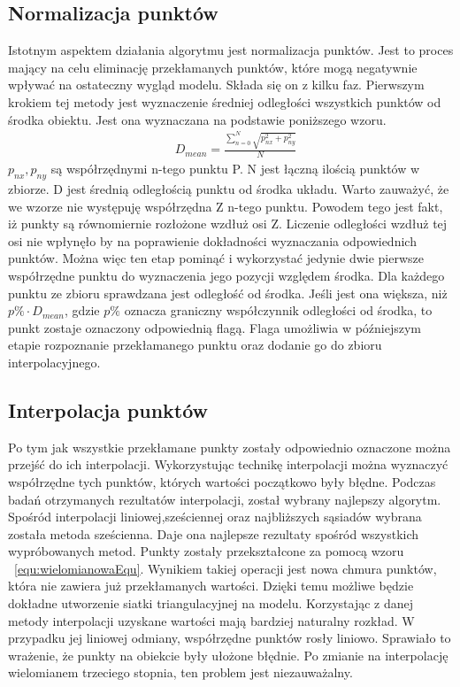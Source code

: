 \subsection{Normalizacja punktów}
Istotnym aspektem działania algorytmu jest normalizacja punktów. Jest to proces mający na celu eliminację przekłamanych punktów, które mogą negatywnie wpływać na ostateczny wygląd modelu. Składa się on z kilku faz.
\newline \indent Pierwszym krokiem tej metody jest wyznaczenie średniej odległości wszystkich punktów od środka obiektu. Jest ona wyznaczana na podstawie poniższego wzoru.
\begin{equation}
    \begin{aligned}
            &D_{mean}=\frac{\sum_{n=0}^{N} \sqrt{p_{nx}^2+p_{ny}^2}}{N}  
    \end{aligned}
\end{equation}
$p_{nx},p_{ny}$ są współrzędnymi n-tego punktu P. N jest łączną ilością punktów w zbiorze. D jest średnią odległością punktu od środka układu. Warto zauważyć, że we wzorze nie występuję współrzędna Z n-tego punktu. Powodem tego jest fakt, iż punkty są równomiernie rozłożone wzdłuż osi Z. Liczenie odległości wzdłuż tej osi nie wpłynęło by na poprawienie dokładności wyznaczania odpowiednich punktów. Można więc ten etap pominąć i wykorzystać jedynie dwie pierwsze współrzędne punktu do wyznaczenia jego pozycji względem środka.
\newline \indent Dla każdego punktu ze zbioru sprawdzana jest odległość od środka. Jeśli jest ona większa, niż $p\% \cdot D_{mean}$, gdzie $p\%$ oznacza graniczny współczynnik odległości od środka, to punkt zostaje oznaczony odpowiednią flagą. Flaga umożliwia w późniejszym etapie rozpoznanie przekłamanego punktu oraz dodanie go do zbioru interpolacyjnego.
\subsection{Interpolacja punktów}
Po tym jak wszystkie przekłamane punkty zostały odpowiednio oznaczone można przejść do ich interpolacji. Wykorzystując technikę interpolacji można wyznaczyć współrzędne tych punktów, których wartości początkowo były błędne. Podczas badań otrzymanych rezultatów interpolacji, został wybrany najlepszy algorytm. Spośród interpolacji liniowej,sześciennej oraz najbliższych sąsiadów wybrana została metoda sześcienna. Daje ona najlepsze rezultaty spośród wszystkich wypróbowanych metod. Punkty zostały przekształcone za pomocą wzoru ~\ref{equ:wielomianowaEqu}. Wynikiem takiej operacji jest nowa chmura punktów, która nie zawiera już przekłamanych wartości. Dzięki temu możliwe będzie dokładne utworzenie siatki triangulacyjnej na modelu. Korzystając z danej metody interpolacji uzyskane wartości mają bardziej naturalny rozkład. W przypadku jej liniowej odmiany, współrzędne punktów rosły liniowo. Sprawiało to wrażenie, że punkty na obiekcie były ułożone błędnie. Po zmianie na interpolację wielomianem trzeciego stopnia, ten problem jest niezauważalny.  

